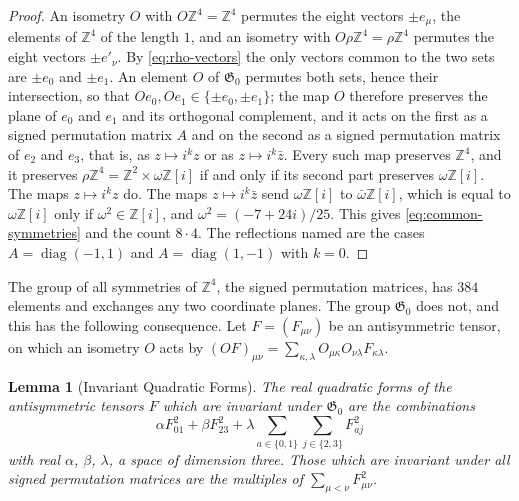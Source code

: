 \documentclass[11pt]{preprint}
\numberwithin{equation}{section}
\newtheorem{lemma}[theorem]{Lemma}
\theoremstyle{definition}
\theoremstyle{remark}
\theoremstyle{plain}
\begin{document}
\begin{proof}
An isometry $O$ with $O\mathbb Z^4 = \mathbb Z^4$ permutes the eight vectors $\pm e_\mu$, the elements of $\mathbb Z^4$ of the length $1$, and an isometry with $O\rho\mathbb Z^4 = \rho\mathbb Z^4$ permutes the eight vectors $\pm e'_\nu$. By \eqref{eq:rho-vectors} the only vectors common to the two sets are $\pm e_0$ and $\pm e_1$. An element $O$ of $\mathfrak G_0$ permutes both sets, hence their intersection, so that $Oe_0, Oe_1 \in \{ \pm e_0, \pm e_1 \}$; the map $O$ therefore preserves the plane of $e_0$ and $e_1$ and its orthogonal complement, and it acts on the first as a signed permutation matrix $A$ and on the second as a signed permutation matrix of $e_2$ and $e_3$, that is, as $z \mapsto i^kz$ or as $z \mapsto i^k\bar z$. Every such map preserves $\mathbb Z^4$, and it preserves $\rho\mathbb Z^4 = \mathbb Z^2 \times \omega\mathbb Z[i]$ if and only if its second part preserves $\omega\mathbb Z[i]$. The maps $z \mapsto i^kz$ do. The maps $z \mapsto i^k\bar z$ send $\omega\mathbb Z[i]$ to $\bar\omega\mathbb Z[i]$, which is equal to $\omega\mathbb Z[i]$ only if $\omega^2 \in \mathbb Z[i]$, and $\omega^2 = (-7 + 24i)/25$. This gives \eqref{eq:common-symmetries} and the count $8 \cdot 4$. The reflections named are the cases $A = \operatorname{diag}(-1, 1)$ and $A = \operatorname{diag}(1, -1)$ with $k = 0$.
\end{proof}

The group of all symmetries of $\mathbb Z^4$, the signed permutation matrices, has $384$ elements and exchanges any two coordinate planes. The group $\mathfrak G_0$ does not, and this has the following consequence. Let $F = (F_{\mu\nu})$ be an antisymmetric tensor, on which an isometry $O$ acts by $(OF)_{\mu\nu} = \sum_{\kappa,\lambda}O_{\mu\kappa}O_{\nu\lambda}F_{\kappa\lambda}$.

\begin{lemma}[Invariant Quadratic Forms]\label{lem:invariant-forms}
The real quadratic forms of the antisymmetric tensors $F$ which are invariant under $\mathfrak G_0$ are the combinations
\begin{equation}\label{eq:invariant-forms}
    \alpha F_{01}^2 + \beta F_{23}^2 + \lambda\sum_{a \in \{ 0, 1 \}}\sum_{j \in \{ 2, 3 \}}F_{aj}^2
\end{equation}
with real $\alpha$, $\beta$, $\lambda$, a space of dimension three. Those which are invariant under all signed permutation matrices are the multiples of $\sum_{\mu<\nu}F_{\mu\nu}^2$.
\end{lemma}
\end{document}
